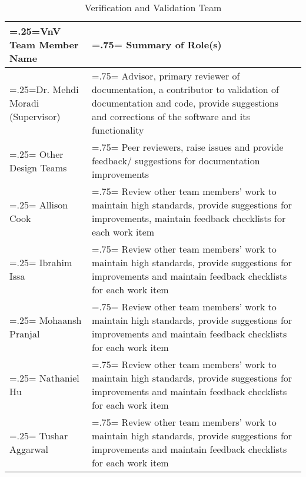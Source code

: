 \documentclass[12pt, titlepage]{article}
\begin{document}
\begin{table}[h]
    \centering
    \begin{tabularx}{\textwidth}{|>{\centering\arraybackslash\hsize=.25\hsize\linewidth=\hsize}X|>{\centering\arraybackslash\hsize=.75\hsize\linewidth=\hsize}X|}
        \hline
        \textbf{VnV Team Member Name} & \textbf{Summary of Role(s)} \\
        \hline
        Dr. Mehdi Moradi (Supervisor) & Advisor, primary reviewer of documentation, a contributor to validation of documentation and code, provide suggestions and corrections of the software and its functionality \\
        \hline
        Other Design Teams & Peer reviewers, raise issues and provide feedback/ suggestions for documentation improvements \\
        \hline
        Allison Cook & Review other team members' work to maintain high standards, provide suggestions for improvements, maintain feedback checklists for each work item \\
        \hline
        Ibrahim Issa & Review other team members' work to maintain high standards, provide suggestions for improvements and maintain feedback checklists for each work item \\
        \hline
        Mohaansh Pranjal & Review other team members' work to maintain high standards, provide suggestions for improvements and maintain feedback checklists for each work item \\
        \hline
        Nathaniel Hu & Review other team members' work to maintain high standards, provide suggestions for improvements and maintain feedback checklists for each work item \\
        \hline
        Tushar Aggarwal & Review other team members' work to maintain high standards, provide suggestions for improvements and maintain feedback checklists for each work item \\
        \hline
    \end{tabularx}
    \caption{Verification and Validation Team}
    \label{tab:VnVTeam}
\end{table}
\end{document}
